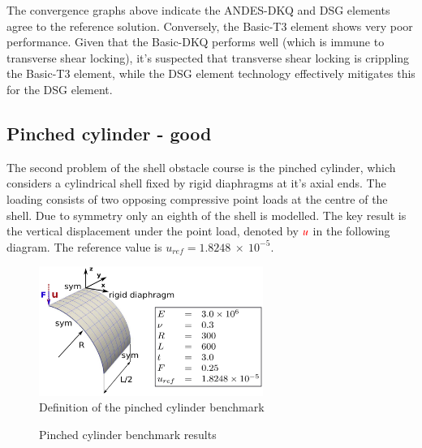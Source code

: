 The convergence graphs above indicate the ANDES-DKQ and DSG elements agree to the reference solution. Conversely, the Basic-T3 element shows very poor performance. Given that the Basic-DKQ performs well (which is immune to transverse shear locking), it's suspected that transverse shear locking is crippling the Basic-T3 element, while the DSG element technology effectively mitigates this for the DSG element. 
\newpage
\subsection{Pinched cylinder - good}
%

The second problem of the shell obstacle course is the pinched cylinder, which considers a cylindrical shell fixed by rigid diaphragms at it's axial ends. The loading consists of two opposing compressive point loads at the centre of the shell. Due to symmetry only an eighth of the shell is modelled. The key result is the vertical displacement under the point load, denoted by $\textcolor{red}{u}$ in the following diagram. The reference value is $u_{ref} =  1.8248\ \times\ 10^{-5}$. 
 
 \begin{figure}[H]
 	\centering
 	\def\svgwidth{\columnwidth}
 	\includegraphics[width=7.3cm]{images/pinchedcylinder.png}
 	\caption{Definition of the pinched cylinder benchmark\cite{Bou13}}
 \end{figure}
 
\begin{figure}[H]
	\caption{\label{ref_label_overall}Pinched cylinder benchmark results}
\end{figure}

